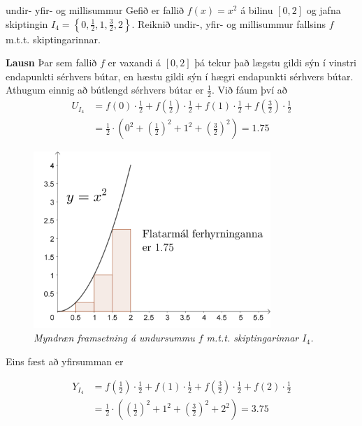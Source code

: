 \begin{syn}{undir- yfir- og millisummur}
Gefið er fallið $f(x) = x^{2}$ á bilinu $[0,2]$ og jafna skiptingin $I_4 = \left\{0,\frac{1}{2},1,\frac{3}{2},2\right\}$. Reiknið undir-, yfir- og millisummur fallsins $f$ m.t.t. skiptingarinnar.

\vspace{2mm}

{\bf Lausn} Þar sem fallið $f$ er vaxandi á $[0,2]$ þá tekur það lægstu gildi sýn í vinstri endapunkti sérhvers bútar, en hæstu gildi sýn í hægri endapunkti sérhvers bútar. Athugum einnig að bútlengd sérhvers bútar er $\frac{1}{2}$. Við fáum því að
\setlength{\jot}{4mm}
\begin{align*}
U_{I_{4}} &= f(0)\cdot\frac{1}{2}+f\left(\frac{1}{2}\right)\cdot\frac{1}{2}+f(1)\cdot\frac{1}{2}+f\left(\frac{3}{2}\right)\cdot\frac{1}{2}\\ &= \frac{1}{2}\cdot\left(0^{2}+\left(\frac{1}{2}\right)^{2}+1^{2}+\left(\frac{3}{2}\right)^{2}\right) = 1.75
\end{align*}

\begin{figure}[H]
\center
\includegraphics[width=0.8\textwidth]{Pictures/k2m2.png}
\caption{\it Myndræn framsetning á undursummu $f$ m.t.t. skiptingarinnar $I_4$.}
\end{figure}

Eins fæst að yfirsumman er

\begin{align*}
Y_{I_{4}} &= f\left(\frac{1}{2}\right)\cdot\frac{1}{2}+f\left(1\right)\cdot\frac{1}{2}+f\left(\frac{3}{2}\right)\cdot\frac{1}{2}+f\left(2\right)\cdot\frac{1}{2}\\ &= \frac{1}{2}\cdot\left(\left(\frac{1}{2}\right)^{2}+1^{2}+\left(\frac{3}{2}\right)^{2}+2^{2}\right) = 3.75
\end{align*}


\end{syn}
